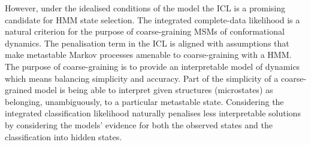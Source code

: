However, under the idealised conditions of the model the ICL is a promising candidate for HMM state selection. The integrated complete-data likelihood is a natural criterion for the purpose of coarse-graining  MSMs of conformational dynamics. The penalisation term in the ICL is aligned with assumptions that make metastable Markov processes amenable to coarse-graining with a HMM. The purpose of coarse-graining is to provide an interpretable model of dynamics which means balancing simplicity and accuracy. Part of the simplicity of a coarse-grained model is being able to interpret given structures (microstates) as belonging, unambiguously, to a particular metastable state. Considering the integrated classification likelihood naturally penalises less interpretable solutions by considering the models' evidence for both the observed states and the classification into hidden states. 











